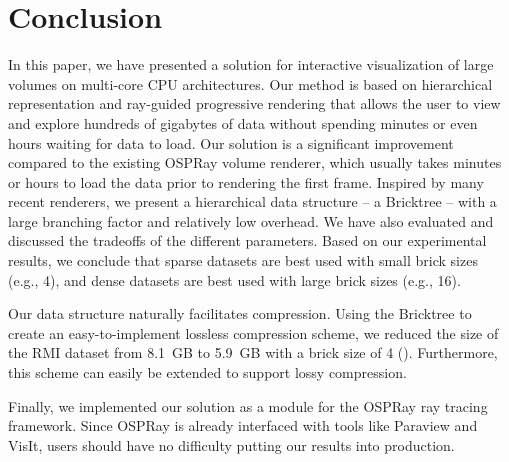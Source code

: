 \section{Conclusion}
In this paper, we have presented a solution for interactive visualization of 
large volumes on multi-core CPU architectures. Our method is based on  
hierarchical representation and ray-guided progressive rendering that 
allows the user to view and explore hundreds of gigabytes of data without
spending minutes or even hours waiting for data to load. 
Our solution is a significant improvement compared to the existing OSPRay volume renderer,
which usually takes minutes or hours to load the data prior to rendering the first frame. 
Inspired by many recent renderers, we present a hierarchical data structure
-- a Bricktree -- with a large branching factor and relatively low overhead. We have
also evaluated and discussed the tradeoffs of the different 
parameters. Based on our experimental results, we conclude that sparse datasets 
are best used with small brick sizes (e.g., 4), and dense datasets are best used with 
large brick sizes (e.g., 16). 

Our data structure naturally facilitates compression. Using the Bricktree to create an easy-to-implement lossless compression scheme, we reduced the size of the RMI dataset from 8.1~GB to 5.9~GB with a brick size of 4 
(). Furthermore, this scheme can easily be extended to support lossy compression.

Finally, we implemented our solution as a module for the OSPRay ray tracing framework. Since OSPRay is already interfaced with tools like Paraview and VisIt, users should have no difficulty putting our results into production.





